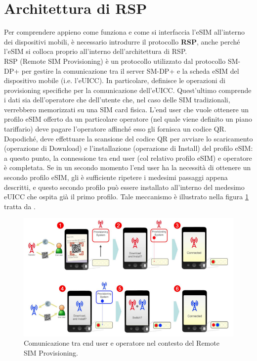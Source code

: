 \documentclass[10pt, oneside]{book}
\begin{document}
\section{Architettura di RSP}
Per comprendere appieno come funziona e come si interfaccia l'eSIM all'interno dei dispositivi mobili, è necessario introdurre il protocollo \textbf{RSP}, anche perché l'eSIM si colloca proprio all'interno dell'architettura di RSP.\\
RSP (Remote SIM Provisioning) è un protocollo utilizzato dal protocollo SM-DP+ per gestire la comunicazione tra il server SM-DP+ e la scheda eSIM del dispositivo mobile (i.e. l'eUICC). In particolare, definisce le operazioni di provisioning specifiche per la comunicazione dell'eUICC. Quest'ultimo comprende i dati sia dell'operatore che dell'utente che, nel caso delle SIM tradizionali, verrebbero memorizzati su una SIM card fisica. L'end user che vuole ottenere un profilo eSIM offerto da un particolare operatore (nel quale viene definito un piano tariffario) deve pagare l'operatore affinché esso gli fornisca un codice QR. Dopodiché, deve effettuare la scansione del codice QR per avviare lo scaricamento (operazione di Download) e l'installazione (operazione di Install) del profilo eSIM: a questo punto, la connessione tra end user (col relativo profilo eSIM) e operatore è completata. Se in un secondo momento l'end user ha la necessità di ottenere un secondo profilo eSIM, gli è sufficiente ripetere i medesimi passaggi appena descritti, e questo secondo profilo può essere installato all'interno del medesimo eUICC che ospita già il primo profilo. Tale meccanismo è illustrato nella figura \ref{fig:RSP-functioning} tratta da \cite{GSMA-whitepaper}.
\begin{figure}
\includegraphics[width=\linewidth]{RSP-functioning.png}
\caption{Comunicazione tra end user e operatore nel contesto del Remote SIM Provisioning.}
\label{fig:RSP-functioning}
\end{figure}
\end{document}
